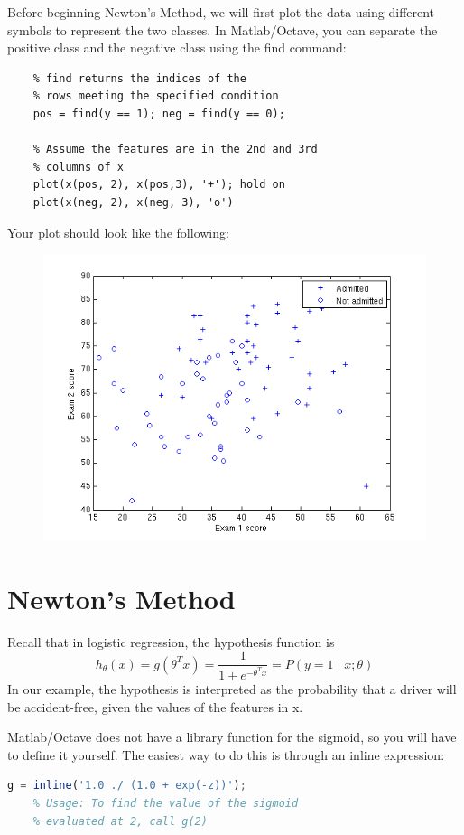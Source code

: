 \documentclass[10pt,a4paper]{article}
\begin{document}
  Before beginning Newton's Method, we will first plot the data using different symbols to represent the two classes. In Matlab/Octave, you can separate the positive class and the negative class using the find command:
  \begin{lstlisting}
    % find returns the indices of the
    % rows meeting the specified condition
    pos = find(y == 1); neg = find(y == 0);

    % Assume the features are in the 2nd and 3rd
    % columns of x
    plot(x(pos, 2), x(pos,3), '+'); hold on
    plot(x(neg, 2), x(neg, 3), 'o')
  \end{lstlisting}
  Your plot should look like the following:
  \begin{figure}[htb!]
    \centering
      \includegraphics[width=.7\columnwidth]{ex4dataonly}
  \end{figure}





\section{Newton's Method}
%
  Recall that in logistic regression, the hypothesis function is 
  \[ h_\theta(x) = g(\theta^T x) = \frac{1}{1+e^{-\theta^T x}} = P(y=1 \mid x; \theta) \]
  In our example, the hypothesis is interpreted as the probability that a driver will be accident-free, given the values of the features in x.

  Matlab/Octave does not have a library function for the sigmoid, so you will have to define it yourself. The easiest way to do this is through an inline expression:
  \begin{lstlisting}[language=Octave, basicstyle=\footnotesize, showspaces=false]
    g = inline('1.0 ./ (1.0 + exp(-z))'); 
    % Usage: To find the value of the sigmoid 
    % evaluated at 2, call g(2)
  \end{lstlisting}
\end{document}
